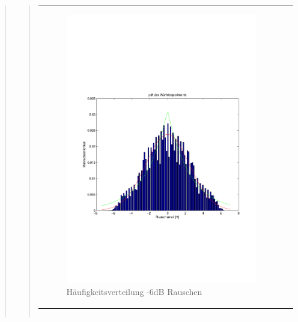 \begin{quote}
\begin{quote}
\begin{center}
\begin{tabular}{ll}
                   \begin{minipage}{0.6\textwidth}
                       \begin{figure}[H]
                           \includegraphics[scale=0.49, trim = 10mm 65mm 10mm 85mm, clip]{./Bilder/PDFRauschen-6dB}
                           \caption{Häufigkeitsverteilung -6dB Rauschen}
                       \end{figure}
        
                   \end{minipage}
        
               \end{tabular}
               \end{center}
        
                      \begin{center}
               \begin{tabular}{ll}
               

\end{tabular}
\end{center}
\end{quote}
\end{quote}
